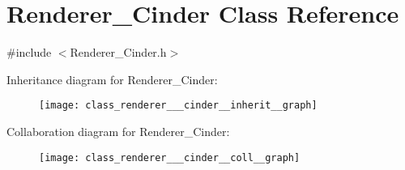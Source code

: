 \hypertarget{class_renderer___cinder}{\section{Renderer\-\_\-\-Cinder Class Reference}
\label{class_renderer___cinder}
}


{\ttfamily \#include $<$Renderer\-\_\-\-Cinder.\-h$>$}



Inheritance diagram for Renderer\-\_\-\-Cinder\-:\nopagebreak
\begin{figure}[H]
\begin{center}
\leavevmode
\texttt{[image: class\_renderer\_\_\_cinder\_\_inherit\_\_graph]}
\end{center}
\end{figure}


Collaboration diagram for Renderer\-\_\-\-Cinder\-:\nopagebreak
\begin{figure}[H]
\begin{center}
\leavevmode
\texttt{[image: class\_renderer\_\_\_cinder\_\_coll\_\_graph]}
\end{center}
\end{figure}
